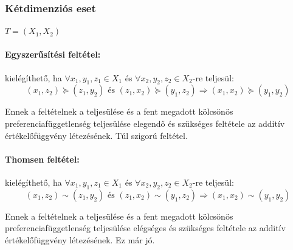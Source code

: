 \documentclass[a4paper,12pt]{article}
\begin{document}
\subsubsection{Kétdimenziós eset}

$T=(X_1,X_2)$

\paragraph{Egyszerűsítési feltétel: } kielégíthető, ha $\forall x_1, y_1, z_1 \in X_1$ és $\forall x_2, y_2, z_2 \in X_2$-re teljesül: 
\begin{equation}
(x_1, z_2) \succeq (z_1, y_2) \text{ és } (z_1, x_2) \succeq (y_1, z_2)  
\Rightarrow
(x_1, x_2) \succeq (y_1, y_2)
\end{equation} 

Ennek a feltételnek a teljesülése és a fent megadott kölcsönös preferenciafüggetlenség teljesülése elegendő és szükséges feltétele az additív értékelőfüggvény létezésének. Túl szigorú feltétel.

\paragraph{Thomsen feltétel:} kielégíthető, ha $\forall x_1, y_1, z_1 \in X_1$ és $\forall x_2, y_2, z_2 \in X_2$-re teljesül: 
\begin{equation}
(x_1, z_2) \sim (z_1, y_2) \text{ és } (z_1, x_2) \sim (y_1, z_2)  
\Rightarrow
(x_1, x_2) \sim (y_1, y_2)
\end{equation} 

Ennek a feltételnek a teljesülése és a fent megadott kölcsönös preferenciafüggetlenség teljesülése elégséges és szükséges feltétele az additív értékelőfüggvény létezésének. Ez már jó.

\end{document}
